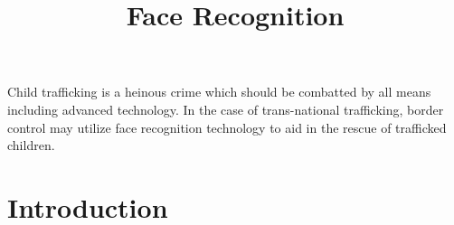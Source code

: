 \documentclass{SBCbookchapter}
\title{Face Recognition}
\author{}
\begin{document}
\maketitle



\vspace{.3in}
\begin{minipage}[r]{4.25in}{\small
  Child trafficking is a heinous crime which should be combatted by all means including advanced technology.  In the case of trans-national
  trafficking, border control may utilize face recognition technology to aid in the rescue of trafficked children.}
  \end{minipage}

\newpage

\section{Introduction}


\end{document}
